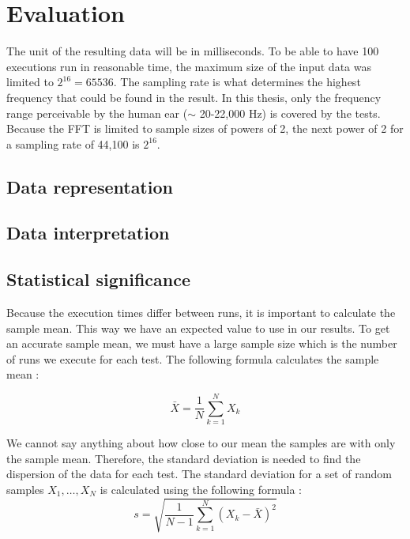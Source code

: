 \section{Evaluation}
The unit of the resulting data will be in milliseconds. To be able to have 100 executions run in reasonable time, the maximum size of the input data was limited to $2^{16} = 65536$. The sampling rate is what determines the highest frequency that could be found in the result. In this thesis, only the frequency range perceivable by the human ear ($\sim$ 20-22,000 Hz) is covered by the tests. Because the FFT is limited to sample sizes of powers of 2, the next power of 2 for a sampling rate of 44,100 is $2^{16}$.



\subsection{Data representation}
\subsection{Data interpretation}
\subsection{Statistical significance}
Because the execution times differ between runs, it is important to calculate the sample mean. This way we have an expected value to use in our results. To get an accurate sample mean, we must have a large sample size which is the number of runs we execute for each test. The following formula calculates the sample mean \cite[p.263]{olofsson2012probability}:

\begin{equation*}
    \bar{X} = \frac{1}{N} \sum\limits_{k = 1}^{N} X_k
\end{equation*}

We cannot say anything about how close to our mean the samples are with only the sample mean. Therefore, the standard deviation is needed to find the dispersion of the data for each test. The standard deviation for a set of random samples $X_1, \dots, X_N$ is calculated using the following formula \cite[p.~302]{olofsson2012probability}:
\begin{equation*}
    s = \sqrt{\frac{1}{N - 1} \sum\limits_{k = 1}^{N}\left(X_k - \bar{X}\right)^2}
\end{equation*}

